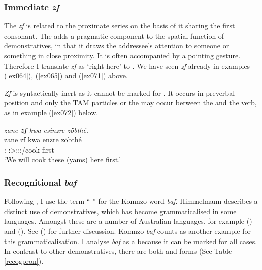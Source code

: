 \subsubsection{Immediate \emph{zf}} \label{immediate-dem}

The   \emph{zf} is related to the proximate series on the basis of it sharing the first consonant. The  adds a pragmatic component to the spatial function of demonstratives, in that it draws the addressee's attention to someone or something in close proximity. It is often accompanied by a pointing gesture. Therefore I translate \emph{zf} as `right here' to . We have seen \emph{zf} already in examples (\ref{ex064}), (\ref{ex065}) and (\ref{ex071}) above.%

\emph{Zf} is syntactically inert as it cannot be marked for . It occurs in preverbal position and only the TAM particles or the  may occur between the   and the verb, as in example (\ref{ex072}) below.

\begin{exe}
	\ex \emph{zane \textbf{zf} kwa esinzre zöbthé.}\\
	\gll zane zf kwa enzre zöbthé\\
	\Dem{}:\Prox{} \Imm{} \Fut{} \Fpl:\Sbj>\Stpl:\Obj:\Nonpast:\Ipfv/cook first\\
	\trans `We will cook these (yams) here first.'
	\label{ex072}
\end{exe}

\subsubsection{Recognitional \emph{baf}} \label{recognitional-pronoun}

Following \citep{Himmelmann:1996tp}, I use the term `` '' for the Komnzo word \textit{baf}. Himmelmann describes a distinct  use of demonstratives, which has become grammaticalised in some languages. Amongst these are a number of Australian languages, for example  (\citealt{Heath:1984uk}) and  (\citealt{Goddard:1985tw}). See (\citealt[231ff.]{Himmelmann:1996tp}) for further discussion. Komnzo \emph{baf} counts as another example for this grammaticalisation. I analyse \emph{baf} as a  because it can be marked for all cases. In contrast to other demonstratives, there are both  and  forms (See Table \ref{recogpron}).%

